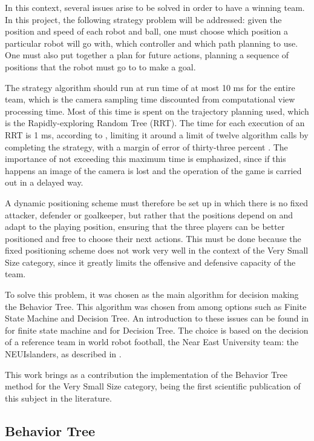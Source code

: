\documentclass[conference]{IEEEtran}
\begin{document}
In this context, several issues arise to be solved in order to have a winning team. In this project, the following strategy problem will be addressed: given the position and speed of each robot and ball, one must choose which position a particular robot will go with, which controller and which path planning to use. One must also put together a plan for future actions, planning a sequence of positions that the robot must go to to make a goal.

The strategy algorithm should run at run time of at most 10 ms for the entire team, which is the camera sampling time discounted from computational view processing time. Most of this time is spent on the trajectory planning used, which is the Rapidly-exploring Random Tree (RRT). The time for each execution of an RRT is 1 ms, according to \cite{franzoni_rrt}, limiting it around a limit of twelve algorithm calls by completing the strategy, with a margin of error of thirty-three percent . The importance of not exceeding this maximum time is emphasized, since if this happens an image of the camera is lost and the operation of the game is carried out in a delayed way.

A dynamic positioning scheme must therefore be set up in which there is no fixed attacker, defender or goalkeeper, but rather that the positions depend on and adapt to the playing position, ensuring that the three players can be better positioned and free to choose their next actions. This must be done because the fixed positioning scheme does not work very well in the context of the Very Small Size category, since it greatly limits the offensive and defensive capacity of the team.

To solve this problem, it was chosen as the main algorithm for decision making the Behavior Tree. This algorithm was chosen from among options such as Finite State Machine and Decision Tree. An introduction to these issues can be found in \cite{orozcomaquinas} for finite state machine and \cite{decision_tree} for Decision Tree. The choice is based on the decision of a reference team in world robot football, the Near East University team: the NEUIslanders, as described in \cite{NEUIslanders_ssl}.

This work brings as a contribution the implementation of the Behavior Tree method for the Very Small Size category, being the first scientific publication of this subject in the literature.

\subsection{Behavior Tree}
\end{document}
